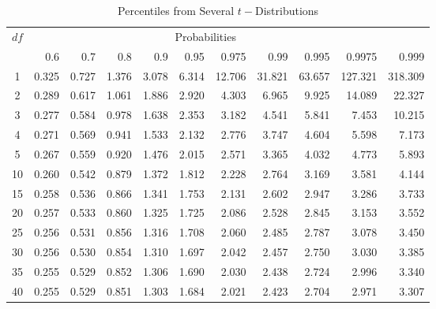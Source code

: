 \begin{table}[h]
 \caption{\label{AP:tProbTable} Percentiles from
Several $t-$Distributions}
\begin{tabular}{crrrrrrrrrr}
\hline  $df$ & \multicolumn{9}{c}{Probabilities} \\

           &        0.6 &        0.7 &        0.8 &        0.9 &       0.95 &      0.975 &       0.99 &      0.995 &     0.9975 &      0.999 \\
\hline
         1 &      0.325 &      0.727 &      1.376 &      3.078 &      6.314 &     12.706 &     31.821 &     63.657 &    127.321 &    318.309 \\
         2 &      0.289 &      0.617 &      1.061 &      1.886 &      2.920 &      4.303 &      6.965 &      9.925 &     14.089 &     22.327 \\
         3 &      0.277 &      0.584 &      0.978 &      1.638 &      2.353 &      3.182 &      4.541 &      5.841 &      7.453 &     10.215 \\
         4 &      0.271 &      0.569 &      0.941 &      1.533 &      2.132 &      2.776 &      3.747 &      4.604 &      5.598 &      7.173 \\
         5 &      0.267 &      0.559 &      0.920 &      1.476 &      2.015 &      2.571 &      3.365 &      4.032 &      4.773 &      5.893 \\
\hline
        10 &      0.260 &      0.542 &      0.879 &      1.372 &      1.812 &      2.228 &      2.764 &      3.169 &      3.581 &      4.144 \\
        15 &      0.258 &      0.536 &      0.866 &      1.341 &      1.753 &      2.131 &      2.602 &      2.947 &      3.286 &      3.733 \\
        20 &      0.257 &      0.533 &      0.860 &      1.325 &      1.725 &      2.086 &      2.528 &      2.845 &      3.153 &      3.552 \\
        25 &      0.256 &      0.531 &      0.856 &      1.316 &      1.708 &      2.060 &      2.485 &      2.787 &      3.078 &      3.450 \\
        30 &      0.256 &      0.530 &      0.854 &      1.310 &      1.697 &      2.042 &      2.457 &      2.750 &      3.030 &      3.385 \\
        35 &      0.255 &      0.529 &      0.852 &      1.306 &      1.690 &      2.030 &      2.438 &      2.724 &      2.996 &      3.340 \\
        40 &      0.255 &      0.529 &      0.851 &      1.303 &      1.684 &      2.021 &      2.423 &      2.704 &      2.971 &      3.307 \\

\end{tabular}
\end{table}

